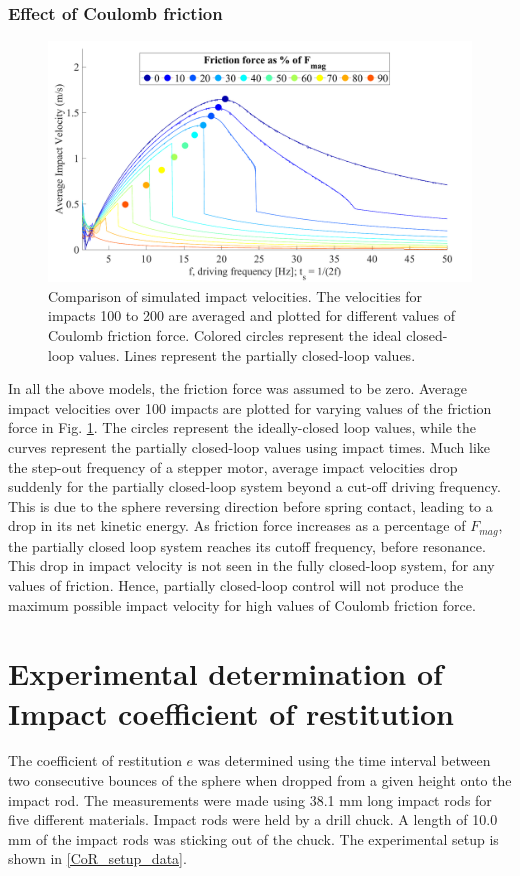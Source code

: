 \documentclass[letterpaper, 10 pt, conference]{ieeeconf}  %
\begin{document}
\subsubsection{Effect of Coulomb friction}
\label{frictionwriteup}
\begin{figure}
	\includegraphics[width=\linewidth]{FrictionForceWithClosedLoopValues.pdf}
		\caption[Effect of Coulomb friction on partially closed-loop control]{Comparison of  simulated impact velocities. The  velocities for impacts 100 to 200 are averaged and plotted for different values of Coulomb friction force. Colored circles represent the ideal closed-loop values.  Lines represent the partially closed-loop values.}
	\label{friction}
	
\end{figure}
In all the above models, the friction force was assumed to be zero. Average impact velocities over 100 impacts are plotted for varying values of the friction force in Fig. \ref{friction}. The circles represent the ideally-closed loop values, while the curves represent the partially closed-loop values using impact times. Much like the step-out frequency of a stepper motor, average impact velocities drop suddenly for the partially closed-loop system beyond a cut-off driving frequency. This is due to the sphere reversing direction before spring contact, leading to a drop in its net kinetic energy. As friction force increases as a percentage of $F_{mag}$, the partially closed loop system reaches its cutoff frequency, before resonance. This drop in impact velocity is not seen in the fully closed-loop system, for any values of friction. Hence, partially closed-loop control will not produce the maximum possible impact velocity for high values of Coulomb friction force. 


\section{Experimental determination of Impact coefficient of restitution}
\label{cor_det}
The coefficient of restitution $e$ was determined using the time interval between two consecutive bounces of the sphere when dropped from a given height onto the impact rod. The measurements were made using 38.1 mm long impact rods for five different materials. Impact rods were held by a drill chuck. A length of 10.0 mm of the impact rods was sticking out of the chuck. The experimental setup is shown in \cref{CoR_setup_data}.
\end{document}
